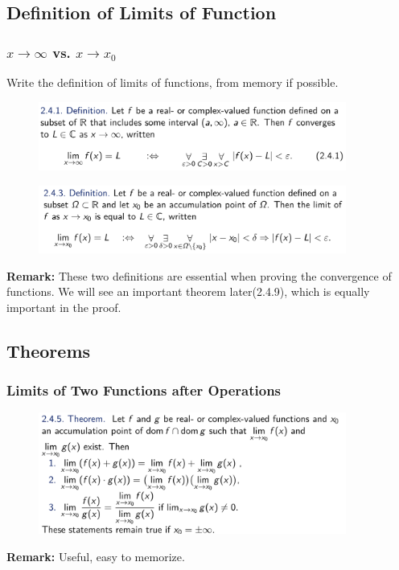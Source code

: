 \documentclass[10pt, t]{beamer}
\begin{document}
\subsection{Definition of Limits of Function}
\begin{frame}
    \frametitle{$x\to \infty$ vs. $x\to x_0$}
    Write the definition of limits of functions, from memory if possible. 
    \pause
    \begin{figure}[H]
        \centering
        \includegraphics[width=0.9\textwidth]{2020-10-14-11-46-12.png}
    \end{figure}
    \pause
    \begin{figure}[H]
        \centering
        \includegraphics[width=0.9\textwidth]{2020-10-14-11-46-54.png}
    \end{figure}
    \textbf{Remark:} These two definitions are essential when proving the convergence of functions. We will see an important theorem later(2.4.9), which is equally important in the proof.
\end{frame}

\subsection{Theorems}
\begin{frame}
    \frametitle{Limits of Two Functions after Operations}
    \begin{figure}[H]
        \centering
        \includegraphics[width=0.9\textwidth]{2020-10-14-11-55-18.png}
    \end{figure}
    
    \textbf{Remark:} Useful, easy to memorize.
\end{frame}
\end{document}

